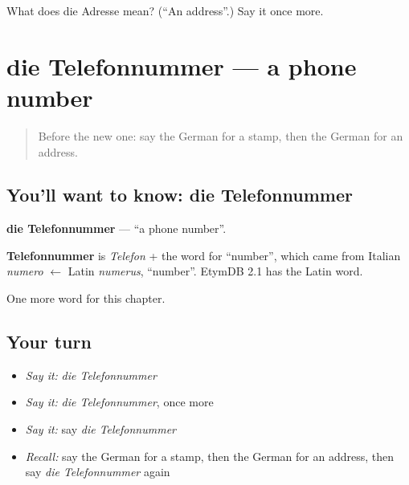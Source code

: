\begin{tcolorbox}[breakable,colback=teal!4,colframe=teal!35!black,title={Before you move on}]
What does die Adresse mean? (\textquotedblleft{}An address\textquotedblright{}.) Say it once more.
\end{tcolorbox}
\section[die Telefonnummer]{die Telefonnummer — a phone number}

\label{lesson:GE-C159-telefonnummer}



\begin{quote}
Before the new one: say the German for a stamp, then the German for an address.
\end{quote}

\subsection*{You'll want to know: die Telefonnummer}
\textbf{die Telefonnummer} — \textquotedblleft{}a phone number\textquotedblright{}.

\begin{cousinweb}
\textbf{Telefonnummer} is \emph{Telefon} + the word for \textquotedblleft{}number\textquotedblright{}, which came from Italian \emph{numero} $\leftarrow$ Latin \emph{numerus}, \textquotedblleft{}number\textquotedblright{}. EtymDB 2.1 has the Latin word.
\end{cousinweb}

\begin{grammarlens}[title={What you've built}]
One more word for this chapter.
\end{grammarlens}

\subsection*{Your turn}
\begin{itemize}
\raggedright
  \item \emph{Say it:} \emph{die Telefonnummer}
  \item \emph{Say it:} \emph{die Telefonnummer}, once more
  \item \emph{Say it:} say \emph{die Telefonnummer}
  \item \emph{Recall:} say the German for a stamp, then the German for an address, then say \emph{die Telefonnummer} again
\end{itemize}

